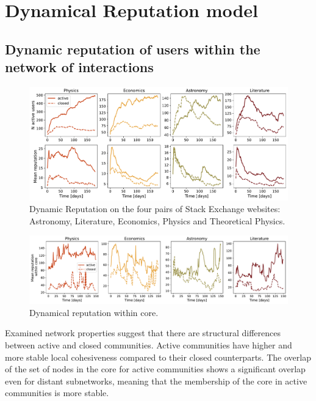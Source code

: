\section{Dynamical Reputation model}


\subsection{Dynamic reputation of users within the network of interactions}

\begin{figure}
	\centering
	\includegraphics[width=\linewidth]{figures/stackexchange/reputation.pdf}
	\caption{Dynamic Reputation on the four pairs of Stack Exchange websites: Astronomy, Literature, Economics,  Physics and Theoretical Physics.}
	\label{fig:dr6panel}
\end{figure}

\begin{figure}
	\centering
	\includegraphics[width=\linewidth]{figures/stackexchange/core_reputation.pdf}
	\caption{Dynamical reputation within core.}
	\label{fig:dr_core}
\end{figure}

Examined network properties suggest that there are structural differences between active and closed communities. Active communities have higher and more stable local cohesiveness compared to their closed counterparts. The overlap of the set of nodes in the core for active communities shows a significant overlap even for distant subnetworks, meaning that the membership of the core in active communities is more stable.

